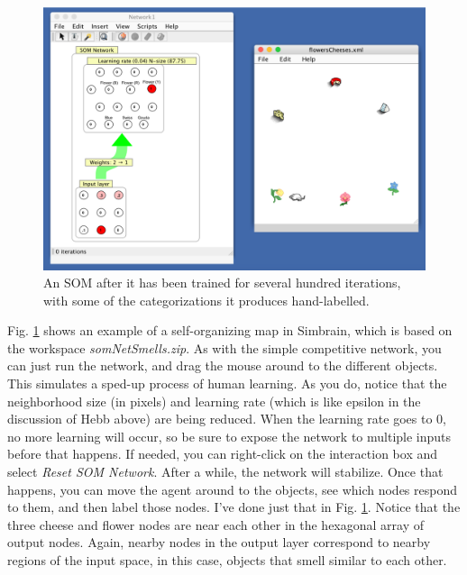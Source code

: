 

\begin{figure}[h]
\centering
\includegraphics[scale=.6]{./images/som_labelled.png}
\caption[Simbrain screenshot.]{An SOM after it has been trained for several hundred iterations, with some of the categorizations it produces hand-labelled.}
\label{som_labelled}
\end{figure}

Fig. \ref{som_labelled}  shows an example of a self-organizing map in Simbrain, which is based on the workspace \emph{somNetSmells.zip}. As with the simple competitive network, you can just run the network, and drag the mouse around to the different objects. This simulates a sped-up process of human learning. As you do, notice that the neighborhood size (in pixels) and learning rate (which is like epsilon in the discussion of Hebb above) are being reduced. When the learning rate goes to 0, no more learning will occur, so be sure to expose the network to multiple inputs before that happens. If needed, you can right-click on the interaction box and select \emph{Reset SOM Network}. After a while, the network will stabilize. Once that happens, you can move the agent around to the objects, see which nodes respond to them,  and then label those nodes. I've done just that in Fig. \ref{som_labelled}. Notice that the three cheese and flower nodes are near each other in the hexagonal array of output nodes. Again, nearby nodes in the output layer correspond to nearby regions of the input space, in this case, objects that smell similar to each other.


